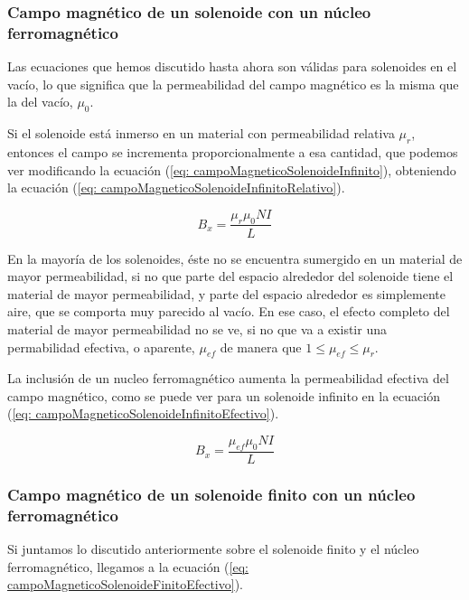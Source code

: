 \documentclass[a4paper,12pt]{article}
\begin{document}
    \subsubsection*{Campo magnético de un solenoide con un núcleo ferromagnético}

        Las ecuaciones que hemos discutido hasta ahora son válidas para solenoides en el vacío, lo que significa que la permeabilidad del campo magnético es la misma que la del vacío, $\mu_0$.

        Si el solenoide está inmerso en un material con permeabilidad relativa $\mu_r$, entonces el campo se incrementa proporcionalmente a esa cantidad, que podemos ver modificando la ecuación (\ref{eq: campoMagneticoSolenoideInfinito}), obteniendo la ecuación (\ref{eq: campoMagneticoSolenoideInfinitoRelativo}).

        \begin{equation}
            \label{eq: campoMagneticoSolenoideInfinitoRelativo}
            B_x = \frac{\mu_r\mu_0 N I}{L}
        \end{equation}

        En la mayoría de los solenoides, éste no se encuentra sumergido en un material de mayor permeabilidad, si no que parte del espacio alrededor del solenoide tiene el material de mayor permeabilidad, y parte del espacio alrededor es simplemente aire, que se comporta muy parecido al vacío. En ese caso, el efecto completo del material de mayor permeabilidad no se ve, si no que va a existir una permabilidad efectiva, o aparente, $\mu_{ef}$ de manera que $1 \leq \mu_{ef} \leq \mu_r$.

        La inclusión de un nucleo ferromagnético aumenta la permeabilidad efectiva del campo magnético, como se puede ver para un solenoide infinito en la ecuación (\ref{eq: campoMagneticoSolenoideInfinitoEfectivo}).

        \begin{equation}
            \label{eq: campoMagneticoSolenoideInfinitoEfectivo}
            B_x = \frac{\mu_{ef}\mu_0 N I}{L}
        \end{equation}

    \subsubsection*{Campo magnético de un solenoide finito con un núcleo ferromagnético}

        Si juntamos lo discutido anteriormente sobre el solenoide finito y el núcleo ferromagnético, llegamos a la ecuación (\ref{eq: campoMagneticoSolenoideFinitoEfectivo}).
\end{document}
